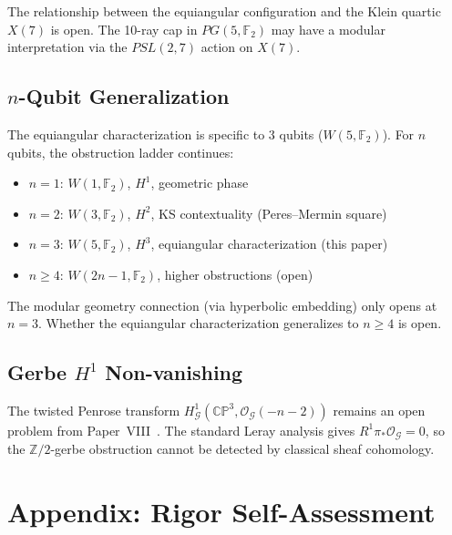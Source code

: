 \documentclass[11pt,a4paper]{article}
\theoremstyle{remark}
\newcommand{\CP}{\mathbb{CP}}
\newcommand{\Z}{\mathbb{Z}}
\newcommand{\F}{\mathbb{F}}
\newcommand{\cO}{\mathcal{O}}
\begin{document}
The relationship between the equiangular configuration and the Klein
quartic $X(7)$ is open. The 10-ray cap in $PG(5, \F_2)$ may have a
modular interpretation via the $PSL(2, 7)$ action on $X(7)$.

\subsection{\texorpdfstring{$n$-Qubit}{n-Qubit} Generalization}

The equiangular characterization is specific to 3 qubits ($W(5, \F_2)$).
For $n$ qubits, the obstruction ladder continues:
\begin{itemize}
  \item $n=1$: $W(1, \F_2)$, $H^1$, geometric phase
  \item $n=2$: $W(3, \F_2)$, $H^2$, KS contextuality (Peres--Mermin square)
  \item $n=3$: $W(5, \F_2)$, $H^3$, equiangular characterization (this paper)
  \item $n \geq 4$: $W(2n-1, \F_2)$, higher obstructions (open)
\end{itemize}

The modular geometry connection (via hyperbolic embedding) only opens
at $n=3$. Whether the equiangular characterization generalizes to
$n \geq 4$ is open.

\subsection{\texorpdfstring{Gerbe $H^1$}{Gerbe H1} Non-vanishing}

The twisted Penrose transform
$H^1_{\mathcal{G}}(\CP^3, \cO_{\mathcal{G}}(-n-2))$ remains an open
problem from Paper~VIII~\cite{PaperVIII}. The standard Leray analysis
gives $R^1\pi_*\cO_{\mathcal{G}} = 0$, so the $\Z/2$-gerbe obstruction
cannot be detected by classical sheaf cohomology.

\section*{Appendix: Rigor Self-Assessment}
\end{document}
